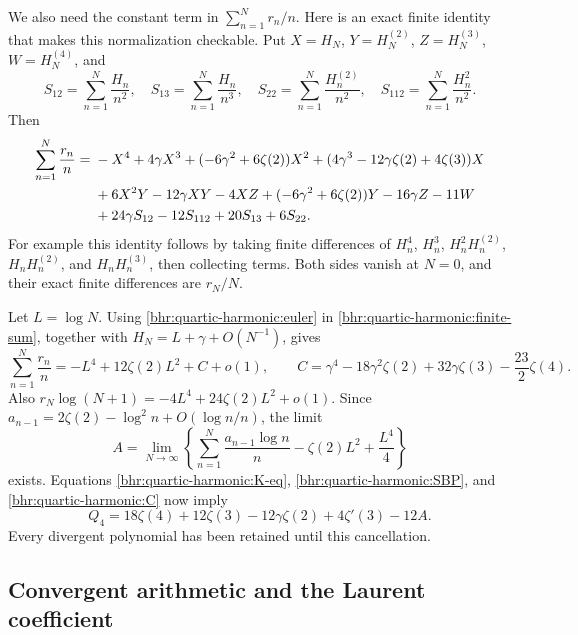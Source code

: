 \documentclass[11pt]{article}
\numberwithin{equation}{section}
\theoremstyle{plain}
\theoremstyle{definition}
\theoremstyle{remark}
\begin{document}
We also need the constant term in $\sum_{n=1}^N r_n/n$.
Here is an exact finite identity that makes this normalization
checkable. Put $X=H_N$, $Y=H_N^{(2)}$, $Z=H_N^{(3)}$,
$W=H_N^{(4)}$, and
\[
 S_{12}=\sum_{n=1}^N\frac{H_n}{n^2},\quad
 S_{13}=\sum_{n=1}^N\frac{H_n}{n^3},\quad
 S_{22}=\sum_{n=1}^N\frac{H_n^{(2)}}{n^2},\quad
 S_{112}=\sum_{n=1}^N\frac{H_n^2}{n^2}.
\]
Then
\begin{align}
 \sum_{n=1}^N\frac{r_n}{n}
 ={}&-X^4+4\gamma X^3+(-6\gamma^2+6\zeta(2))X^2
       +(4\gamma^3-12\gamma\zeta(2)+4\zeta(3))X\notag\\
 &+6X^2Y-12\gamma XY-4XZ
       +(-6\gamma^2+6\zeta(2))Y-16\gamma Z-11W\notag\\
 &+24\gamma S_{12}-12S_{112}+20S_{13}+6S_{22}.
 \label{bhr:quartic-harmonic:finite-sum}
\end{align}
For example this identity follows by taking finite differences of
$H_n^4$, $H_n^3$, $H_n^2H_n^{(2)}$, $H_nH_n^{(2)}$,
and $H_nH_n^{(3)}$, then collecting terms. Both sides vanish at
$N=0$, and their exact finite differences are $r_N/N$.

Let $L=\log N$. Using \eqref{bhr:quartic-harmonic:euler} in
\eqref{bhr:quartic-harmonic:finite-sum}, together with
$H_N=L+\gamma+O(N^{-1})$, gives
\begin{equation}
 \sum_{n=1}^N\frac{r_n}{n}
 =-L^4+12\zeta(2)L^2+C+o(1),\qquad
 C=\gamma^4-18\gamma^2\zeta(2)+32\gamma\zeta(3)
       -\frac{23}2\zeta(4).
 \label{bhr:quartic-harmonic:C}
\end{equation}
Also
$r_N\log(N+1)=-4L^4+24\zeta(2)L^2+o(1)$.
Since $a_{n-1}=2\zeta(2)-\log^2n+O(\log n/n)$, the limit
\begin{equation}
 A=\lim_{N\to\infty}\left\{
  \sum_{n=1}^N\frac{a_{n-1}\log n}{n}
      -\zeta(2)L^2+\frac{L^4}{4}\right\}
 \label{bhr:quartic-harmonic:A}
\end{equation}
exists. Equations \eqref{bhr:quartic-harmonic:K-eq},
\eqref{bhr:quartic-harmonic:SBP}, and \eqref{bhr:quartic-harmonic:C}
now imply
\begin{equation}
 Q_4=18\zeta(4)+12\zeta(3)-12\gamma\zeta(2)
                         +4\zeta'(3)-12A.
 \label{bhr:quartic-harmonic:before-Laurent}
\end{equation}
Every divergent polynomial has been retained until this cancellation.

\subsection{Convergent arithmetic and the Laurent coefficient}
\end{document}
